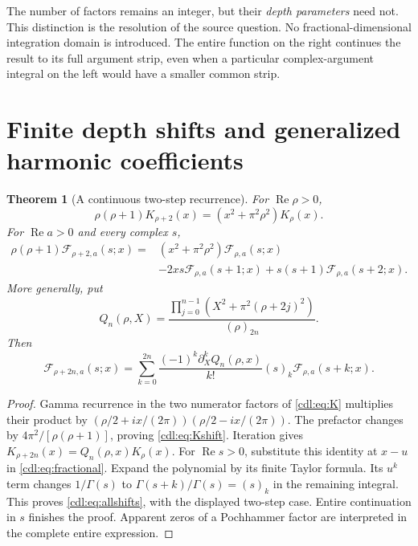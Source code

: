 \documentclass[11pt,letterpaper]{article}
\numberwithin{equation}{section}
\newtheorem{theorem}{Theorem}[section]
\theoremstyle{definition}\newtheorem{definition}[theorem]{Definition}
\theoremstyle{remark}\newtheorem{remark}[theorem]{Remark}
\newcommand{\Rea}{\operatorname{Re}}\newcommand{\Ima}{\operatorname{Im}}
\newcommand{\F}{\mathcal F}\newcommand{\E}{\mathcal E}
\begin{document}
The number of factors remains an integer, but their \emph{depth
parameters} need not. This distinction is the resolution of the source
question. No fractional-dimensional integration domain is introduced.
The entire function on the right continues the result to its full
argument strip, even when a particular complex-argument integral on the
left would have a smaller common strip.

\section{Finite depth shifts and generalized harmonic coefficients}
\label{cdl:sec:shifts}

\begin{theorem}[A continuous two-step recurrence]\label{cdl:thm:shift}
For $\Rea\rho>0$,
\begin{equation}\label{cdl:eq:Kshift}
 \rho(\rho+1)K_{\rho+2}(x)=(x^2+\pi^2\rho^2)K_\rho(x).
\end{equation}
For $\Rea a>0$ and every complex $s$,
\begin{equation}\label{cdl:eq:Fshift}
 \begin{split}
 \rho(\rho+1)\F_{\rho+2,a}(s;x)
 ={}&(x^2+\pi^2\rho^2)\F_{\rho,a}(s;x)\\
 &-2xs\F_{\rho,a}(s+1;x)
   +s(s+1)\F_{\rho,a}(s+2;x).
 \end{split}
\end{equation}
More generally, put
\begin{equation}\label{cdl:eq:shiftpoly}
 Q_n(\rho,X)=\frac{\prod_{j=0}^{n-1}(X^2+\pi^2(\rho+2j)^2)}{(\rho)_{2n}}.
\end{equation}
Then
\begin{equation}\label{cdl:eq:allshifts}
 \F_{\rho+2n,a}(s;x)=
 \sum_{k=0}^{2n}\frac{(-1)^k\partial_X^kQ_n(\rho,x)}{k!}
 (s)_k\F_{\rho,a}(s+k;x).
\end{equation}
\end{theorem}
\begin{proof}
Gamma recurrence in the two numerator factors of \eqref{cdl:eq:K}
multiplies their product by
$(\rho/2+ix/(2\pi))(\rho/2-ix/(2\pi))$.
The prefactor changes by $4\pi^2/[\rho(\rho+1)]$, proving
\eqref{cdl:eq:Kshift}. Iteration gives
$K_{\rho+2n}(x)=Q_n(\rho,x)K_\rho(x)$.
For $\Rea s>0$, substitute this identity at $x-u$ in
\eqref{cdl:eq:fractional}. Expand the polynomial by its finite Taylor
formula. Its $u^k$ term changes $1/\Gamma(s)$ to
$\Gamma(s+k)/\Gamma(s)=(s)_k$ in the remaining integral.
This proves \eqref{cdl:eq:allshifts}, with the displayed two-step case.
Entire continuation in $s$ finishes the proof. Apparent zeros of a
Pochhammer factor are interpreted in the complete entire expression.
\end{proof}
\end{document}
